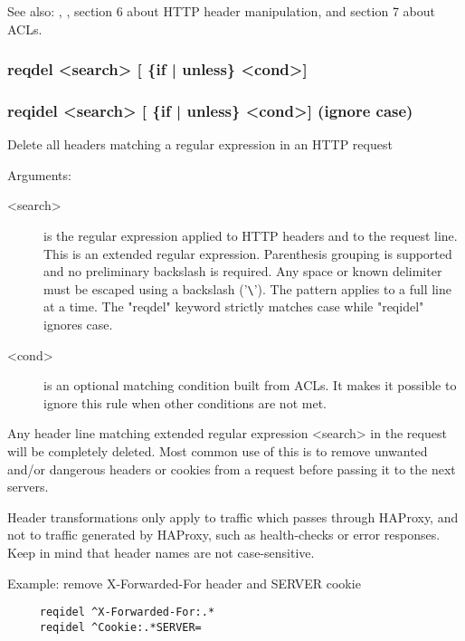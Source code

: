   See also: , , section 6 about HTTP header manipulation, and
            section 7 about ACLs.

\subsubsection[reqdel]{reqdel  <search> [ \{if | unless\} <cond>]}
\subsubsection[reqidel]{reqidel <search> [ \{if | unless\} <cond>]  (ignore case)}


  Delete all headers matching a regular expression in an HTTP request


  Arguments:

\begin{description}
\item[<search>]  is the regular expression applied to HTTP headers and to the
              request line. This is an extended regular expression. Parenthesis
              grouping is supported and no preliminary backslash is required.
              Any space or known delimiter must be escaped using a backslash
              ('\verb|\|'). The pattern applies to a full line at a time. The "reqdel"
              keyword strictly matches case while "reqidel" ignores case.

\item[<cond>] is an optional matching condition built from ACLs. It makes it
              possible to ignore this rule when other conditions are not met.
\end{description}

  Any header line matching extended regular expression <search> in the request
  will be completely deleted. Most common use of this is to remove unwanted
  and/or dangerous headers or cookies from a request before passing it to the
  next servers.

  Header transformations only apply to traffic which passes through HAProxy,
  and not to traffic generated by HAProxy, such as health-checks or error
  responses. Keep in mind that header names are not case-sensitive.

  Example: remove X-Forwarded-For header and SERVER cookie
\begin{verbatim}
     reqidel ^X-Forwarded-For:.*
     reqidel ^Cookie:.*SERVER=
\end{verbatim}

